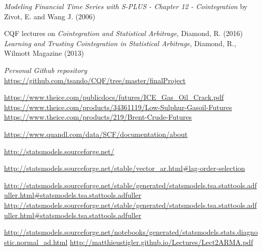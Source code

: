 \documentclass[11pt]{article}
\begin{document}
    \begin{thebibliography}{1}
    
 {\em Modeling Financial Time Series with S-PLUS - Chapter 12 - Cointegration} by Zivot, E. and Wang J. (2006)

 CQF lectures on {\em Cointegration and Statistical Arbitrage}, Diamond, R. (2016)
  {\em Learning and Trusting Cointegration in Statistical Arbitrage}, Diamond, R., Wilmott Magazine (2013)

  {\em Personal Github repository}   \href{https://github.com/tsando/CQF/tree/master/finalProject}{https://github.com/tsando/CQF/tree/master/finalProject}
    
 \href{https://www.theice.com/publicdocs/futures/ICE\_Gas\_Oil\_Crack.pdf}{https://www.theice.com/publicdocs/futures/ICE\_Gas\_Oil\_Crack.pdf}
 \href{https://www.theice.com/products/34361119/Low-Sulphur-Gasoil-Futures}{https://www.theice.com/products/34361119/Low-Sulphur-Gasoil-Futures}
 \href{https://www.theice.com/products/219/Brent-Crude-Futures}{https://www.theice.com/products/219/Brent-Crude-Futures}

 \href{https://www.quandl.com/data/SCF/documentation/about}{https://www.quandl.com/data/SCF/documentation/about}


 \href{http://statsmodels.sourceforge.net/}{http://statsmodels.sourceforge.net/}

 \href{http://statsmodels.sourceforge.net/stable/vector\_ar.html\#lag-order-selection}{http://statsmodels.sourceforge.net/stable/vector\_ar.html\#lag-order-selection}

 \href{http://statsmodels.sourceforge.net/stable/generated/statsmodels.tsa.stattools.adfuller.html\#statsmodels.tsa.stattools.adfuller}{http://statsmodels.sourceforge.net/stable/generated/statsmodels.tsa.stattools.adfuller.html\#statsmodels.tsa.stattools.adfuller}
 \href{http://statsmodels.sourceforge.net/stable/generated/statsmodels.tsa.stattools.adfuller.html\#statsmodels.tsa.stattools.adfuller}{http://statsmodels.sourceforge.net/stable/generated/statsmodels.tsa.stattools.adfuller.html\#statsmodels.tsa.stattools.adfuller}

 \href{http://statsmodels.sourceforge.net/notebooks/generated/statsmodels.stats.diagnostic.normal\_ad.html}{http://statsmodels.sourceforge.net/notebooks/generated/statsmodels.stats.diagnostic.normal\_ad.html}
 \href{http://matthieustigler.github.io/Lectures/Lect2ARMA.pdf}{http://matthieustigler.github.io/Lectures/Lect2ARMA.pdf}


\end{thebibliography}
\end{document}
